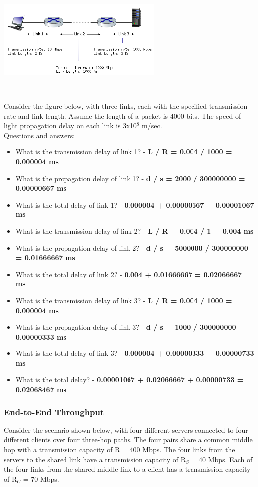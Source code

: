 \documentclass{article}
\begin{document}
\centerline{\includegraphics[width=8cm]{./assets/ex4}} \

\noindent Consider the figure below, with three links, each with the specified transmission rate and link length.
Assume the length of a packet is 4000 bits. The speed of light propagation delay on each link is 3x10$^8$ m/sec. \\

\noindent Questions and answers:

\begin{itemize}
	\item What is the transmission delay of link 1? - \textbf{L / R = 0.004 / 1000 = 0.000004 ms}
	\item What is the propagation delay of link 1? - \textbf{d / s = 2000 / 300000000 = 0.00000667 ms}
	\item What is the total delay of link 1? - \textbf{0.000004 + 0.00000667 = 0.00001067 ms}
	\item What is the transmission delay of link 2? - \textbf{L / R = 0.004 / 1 = 0.004 ms}
	\item What is the propagation delay of link 2? - \textbf{d / s = 5000000 / 300000000 = 0.01666667 ms}
	\item What is the total delay of link 2? - \textbf{0.004 + 0.01666667 = 0.02066667 ms}
	\item What is the transmission delay of link 3? - \textbf{L / R = 0.004 / 1000 = 0.000004 ms}
	\item What is the propagation delay of link 3? - \textbf{d / s = 1000 / 300000000 = 0.00000333 ms}
	\item What is the total delay of link 3? - \textbf{0.000004 + 0.00000333 = 0.00000733 ms}
	\item What is the total delay? - \textbf{0.00001067 + 0.02066667 + 0.00000733 = 0.02068467 ms}
\end{itemize}

\subsubsection{End-to-End Throughput}
Consider the scenario shown below, with four different servers connected to four different clients over four three-hop paths. The four pairs share a common middle hop with a transmission capacity of R = 400 Mbps. The four links from the servers to the shared link have a transmission capacity of R$_S$ = 40 Mbps. Each of the four links from the shared middle link to a client has a transmission capacity of R$_C$ = 70 Mbps. \\
\end{document}
